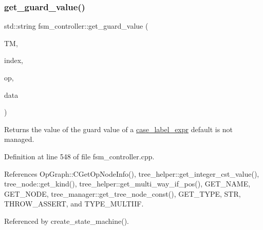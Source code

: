 \subsubsection{\texorpdfstring{get\+\_\+guard\+\_\+value()}{get\_guard\_value()}}
{\footnotesize\ttfamily std\+::string fsm\+\_\+controller\+::get\+\_\+guard\+\_\+value (\begin{DoxyParamCaption}\item[{const \hyperlink{tree__manager_8hpp_a96ff150c071ce11a9a7a1e40590f205e}{tree\+\_\+manager\+Ref}}]{TM,  }\item[{const unsigned int}]{index,  }\item[{\hyperlink{graph_8hpp_abefdcf0544e601805af44eca032cca14}{vertex}}]{op,  }\item[{const \hyperlink{op__graph_8hpp_a9a0b240622c47584bee6951a6f5de746}{Op\+Graph\+Const\+Ref}}]{data }\end{DoxyParamCaption})\hspace{0.3cm}{\ttfamily [private]}}



Returns the value of the guard value of a \hyperlink{structcase__label__expr}{case\+\_\+label\+\_\+expr} default is not managed. 



Definition at line 548 of file fsm\+\_\+controller.\+cpp.



References Op\+Graph\+::\+C\+Get\+Op\+Node\+Info(), tree\+\_\+helper\+::get\+\_\+integer\+\_\+cst\+\_\+value(), tree\+\_\+node\+::get\+\_\+kind(), tree\+\_\+helper\+::get\+\_\+multi\+\_\+way\+\_\+if\+\_\+pos(), G\+E\+T\+\_\+\+N\+A\+ME, G\+E\+T\+\_\+\+N\+O\+DE, tree\+\_\+manager\+::get\+\_\+tree\+\_\+node\+\_\+const(), G\+E\+T\+\_\+\+T\+Y\+PE, S\+TR, T\+H\+R\+O\+W\+\_\+\+A\+S\+S\+E\+RT, and T\+Y\+P\+E\+\_\+\+M\+U\+L\+T\+I\+IF.



Referenced by create\+\_\+state\+\_\+machine().

